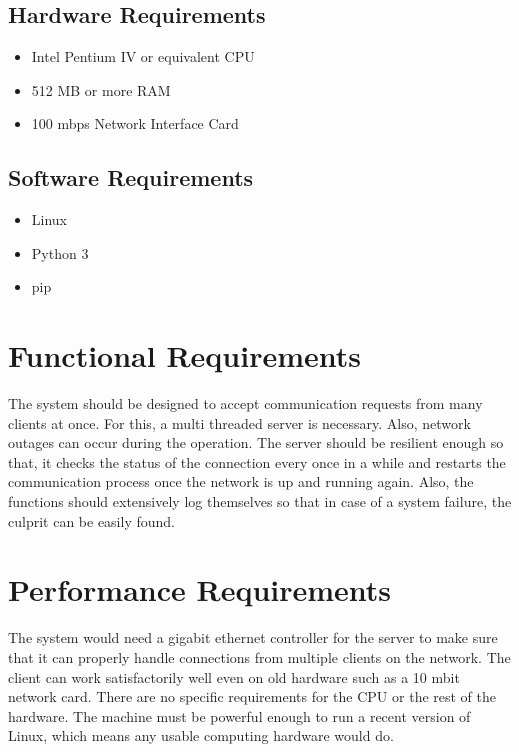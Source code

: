 \subsection{Hardware Requirements}
\begin{itemize}
    \item Intel Pentium IV or equivalent CPU
    \item 512 MB or more RAM
    \item 100 mbps Network Interface Card
\end{itemize}

\subsection{Software Requirements}
\begin{itemize}
    \item Linux
    \item Python 3
    \item pip
\end{itemize}

\section{Functional Requirements}
The system should be designed to accept communication requests from many
clients at once. For this, a multi threaded server is necessary. Also, network
outages can occur during the operation. The server should be resilient enough
so that, it checks the status of the connection every once in a while and
restarts the communication process once the network is up and running again.
Also, the functions should extensively log themselves so that in case of a
system failure, the culprit can be easily found.

\section{Performance Requirements}
The system would need a gigabit ethernet controller for the server to make sure
that it can properly handle connections from multiple clients on the network.
The client can work satisfactorily well even on old hardware such as a 10 mbit
network card. There are no specific requirements for the CPU or the rest of the
hardware. The machine must be powerful enough to run a recent version of Linux,
which means any usable computing hardware would do.

